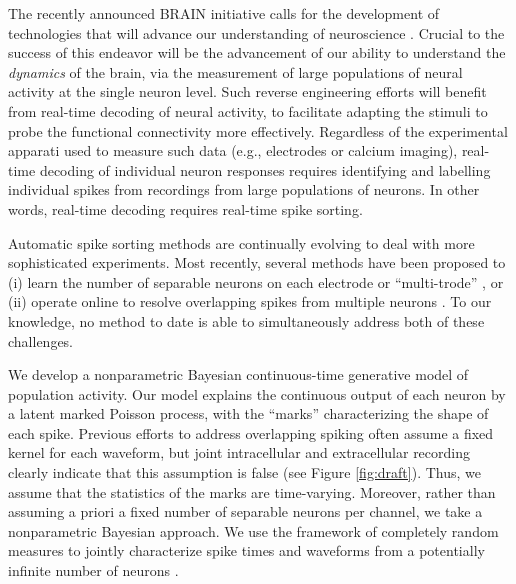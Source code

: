 
The recently announced BRAIN initiative calls for the development of technologies that will advance our understanding of neuroscience \cite{??}.  Crucial to the success of this endeavor will be the advancement of our ability to understand the \emph{dynamics} of the brain, via the measurement of large populations of neural activity at the single neuron level.  Such reverse engineering efforts will benefit from real-time decoding of neural activity, to facilitate adapting the stimuli to probe the functional connectivity more effectively.  Regardless of the experimental apparati used to measure such data (e.g., electrodes or calcium imaging), real-time decoding of individual neuron responses requires identifying and labelling individual spikes from recordings from large populations of neurons.
In other words, real-time decoding requires real-time spike sorting.

Automatic spike sorting methods are continually evolving to deal with more sophisticated experiments.  Most recently, several methods have been proposed to (i) learn the number of separable neurons on each electrode or ``multi-trode'' \cite{??}, or (ii) operate online to resolve overlapping spikes from multiple neurons \cite{??}.   To our knowledge, no method to date is able to simultaneously address both of these challenges.  

We develop a nonparametric Bayesian continuous-time generative model of population activity.  Our model explains the continuous output of each neuron
by a latent marked Poisson process, with the ``marks'' characterizing the shape of each spike.  Previous efforts to address overlapping spiking often assume a fixed kernel for each waveform, but joint intracellular and extracellular recording clearly indicate that this assumption is false (see Figure \ref{fig:draft}). Thus, we assume that the statistics of the marks are time-varying.  Moreover, rather than assuming a priori a fixed number of separable neurons per channel, we take a nonparametric Bayesian approach.  We use the framework of completely random measures to jointly characterize spike times and waveforms from 
a potentially infinite number of neurons \cite{??}.  

